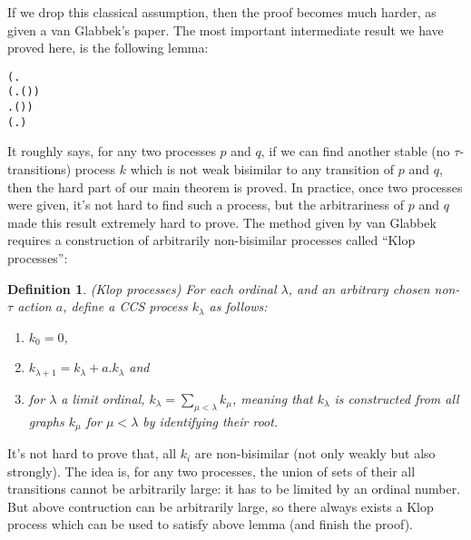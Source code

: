 \documentclass{eptcs} %
\newtheorem{definition}{Definition}[section]
\begin{document}
If we drop this classical assumption, then the proof becomes much
harder, as given a van Glabbek's paper. The most important
intermediate result we have proved here, is the following lemma:
\begin{alltt}
\HOLTokenTurnstile{} (\HOLSymConst{\HOLTokenExists{}}.
          \HOLSymConst{\HOLTokenConj{}} (\HOLSymConst{\HOLTokenForall{}} .  \HOLTokenWeakTransBegin{}\HOLTokenWeakTransEnd {} \HOLSymConst{\HOLTokenImp{}} \HOLSymConst{\HOLTokenNeg{}}( \HOLSymConst{\HOLTokenWeakEQ} )) \HOLSymConst{\HOLTokenConj{}}
        \HOLSymConst{\HOLTokenForall{}} .  \HOLTokenWeakTransBegin{}\HOLTokenWeakTransEnd {} \HOLSymConst{\HOLTokenImp{}} \HOLSymConst{\HOLTokenNeg{}}( \HOLSymConst{\HOLTokenWeakEQ} )) \HOLSymConst{\HOLTokenImp{}}
   (\HOLSymConst{\HOLTokenForall{}}.  \HOLSymConst{+}  \HOLSymConst{\HOLTokenWeakEQ}  \HOLSymConst{+} ) \HOLSymConst{\HOLTokenImp{}}
    \HOLSymConst{\HOLTokenObsCongr} 
\end{alltt}
It roughly says, for any two processes $p$ and $q$, if we can find
another stable (no $\tau$-transitions) process $k$ which is not weak bisimilar to any transition of
$p$ and $q$, then the hard part of our main theorem is proved. In
practice, once two processes were given, it's not hard to find
such a process, but the arbitrariness of $p$ and $q$ made this result
extremely hard to prove. The method given by van Glabbek requires a
construction of arbitrarily non-bisimilar processes called ``Klop
processes'':
\begin{definition}{(Klop processes)}
For each ordinal $\lambda$, and an arbitrary chosen non-$\tau$ action $a$,
define a CCS process $k_\lambda$ as follows:
\begin{enumerate}
\item $k_0 = 0$,
\item $k_{\lambda+1} = k_\lambda + a.k_\lambda$ and
\item for $\lambda$ a limit ordinal, $k_\lambda = \sum_{\mu < \lambda}
  k_\mu$, meaning that $k_\lambda$ is constructed from all graphs
  $k_\mu$ for $\mu < \lambda$ by identifying their root.
\end{enumerate}
\end{definition}
It's not hard to prove that, all $k_i$ are non-bisimilar (not only
weakly but also strongly). The idea is, for any two processes, the union of sets of their all
transitions cannot be arbitrarily large: it has to be limited by an
ordinal number. But above contruction can be arbitrarily large, so
there always exists a Klop process which can be used to satisfy above
lemma (and finish the proof).
\end{document}
